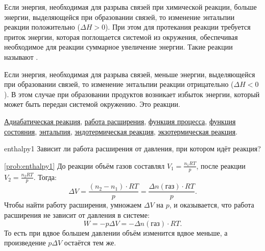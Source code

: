 Если энергия, необходимая для разрыва связей при химической реакции, больше энергии, выделяющейся при образовании связей, то изменение энтальпии реакции положительно ($\Delta{}H > 0$). При этом для протекания реакции требуется приток энергии, которая поглощается системой из окружения, обеспечивая необходимое для реакции суммарное увеличение энергии. Такие реакции называют .

Если энергия, необходимая для разрыва связей, меньше энергии, выделяющейся при образовании связей, то изменение энтальпии реакции отрицательно ($\Delta{}H < 0$). В этом случае при образовании продуктов возникает избыток энергии, который может быть передан системой окружению. Это  реакции.

\begin{termlist}
    \hyperref[term:adiabatic_reaction]{Адиабатическая реакция},
    \hyperref[term:expansion_work]{работа расширения},
    \hyperref[term:process_function]{функция процесса},
    \hyperref[term:state_function]{функция состояния},
    \hyperref[term:enthalpy]{энтальпия},
    \hyperref[term:endothermic_reaction]{эндотермическая реакция},
    \hyperref[term:exothermic_reaction]{экзотермическая реакция}.
\end{termlist}

\begin{problem}{}{enthalpy1}
    Зависит ли работа расширения от давления, при котором идёт реакция?
    \begin{sol}{\ref{prob:enthalpy1}}
        До реакции объём газов составлял $V_1 = \frac{n_1RT}{p}$, после реакции $V_2 = \frac{n_2RT}{p}$. Тогда:
        \begin{equation*}
            \Delta{}V = \frac{(n_2 - n_1) \cdot RT}{p} = \frac{\Delta{}n(\text{газ}) \cdot RT}{p}.
        \end{equation*}
        Чтобы найти работу расширения, умножаем $\Delta{}V$ на $p$, и оказывается, что работа расширения не зависит от давления в системе:
        \begin{equation*}
            W = -p\Delta{}V = -\Delta{}n(\text{газ}) \cdot RT.
        \end{equation*}
        То есть при вдвое большем давлении объём изменится вдвое меньше, а произведение $p\Delta{}V$ остаётся тем же.
    \end{sol}
\end{problem}

